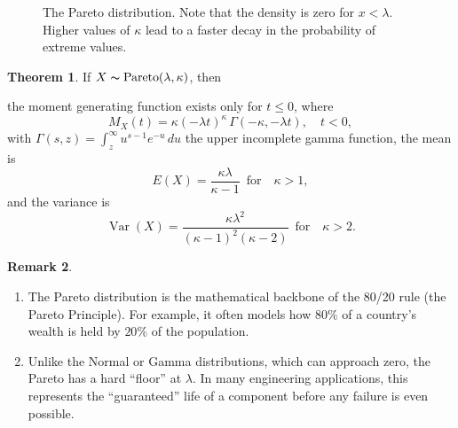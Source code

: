 \documentclass[12pt,a4paper]{report}
\theoremstyle{definition}
\newtheorem{thm}{Theorem}[section]
\newtheorem{remark}[thm]{Remark}
\theoremstyle{plain}
\theoremstyle{definition}
\begin{document}
\begin{figure}[H]
\centering
{}
\caption{The Pareto distribution. Note that the density is zero for $x < \lambda$. Higher values of $\kappa$ lead to a faster decay in the probability of extreme values.}
\end{figure}


\begin{thm}
If $X\thicksim \operatorname{Pareto}(\lambda, \kappa)$, then

the moment generating function exists only for $t\leq 0$, where \[M_X(t) = \kappa (-\lambda t)^{\kappa}\,\Gamma(-\kappa,-\lambda t),\quad t<0,\]
with $\Gamma(s, z) = \int_z^\infty u^{s - 1}e^{-u}\,du$ the upper incomplete gamma function,
the mean is \[E(X) = \frac{\kappa \lambda}{\kappa - 1}\,\,\, \text{for}\quad \kappa > 1,\] and the variance is \[\operatorname{Var}(X) = \frac{\kappa \lambda^2}{(\kappa - 1)^2(\kappa - 2)}\,\,\, \text{for}\quad \kappa > 2.\]
\end{thm}



\begin{remark}
\textbf{ }
\begin{enumerate}
\item The Pareto distribution is the mathematical backbone of the 80/20 rule (the Pareto Principle). For example, it often models how $80\%$ of a country's wealth is held by $20\%$ of the population.
\item Unlike the Normal or Gamma distributions, which can approach zero, the Pareto has a hard ``floor'' at $\lambda$. In many engineering applications, this represents the ``guaranteed'' life of a component before any failure is even possible.
\end{enumerate}
\end{remark}
\end{document}
